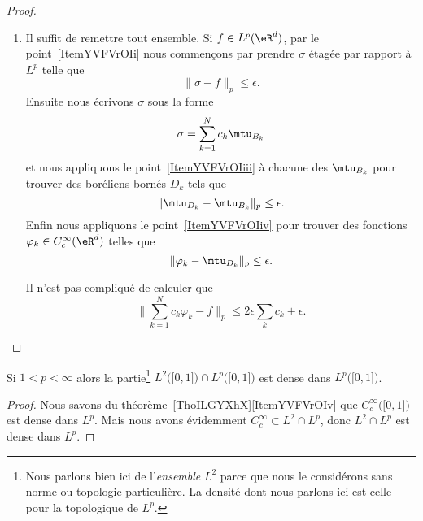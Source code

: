 \begin{proof}
\begin{enumerate}
		\item

		      Il suffit de remettre tout ensemble. Si \( f\in L^p(\eR^d)\), par le point~\ref{ItemYVFVrOIi} nous commençons par prendre \( \sigma\) étagée par rapport à \( L^p\) telle que
		      \begin{equation}
			      \| \sigma-f \|_p\leq\epsilon.
		      \end{equation}
		      Ensuite nous écrivons \( \sigma\) sous la forme
		      \begin{equation}
			      \sigma=\sum_{k=1}^Nc_k\mtu_{B_k}
		      \end{equation}
		      et nous appliquons le point~\ref{ItemYVFVrOIiii} à chacune des \( \mtu_{B_k}\) pour trouver des boréliens bornés \( D_k\) tels que
		      \begin{equation}
			      \| \mtu_{D_k}-\mtu_{B_k} \|_p\leq \epsilon.
		      \end{equation}
		      Enfin nous appliquons le point~\ref{ItemYVFVrOIiv} pour trouver des fonctions \( \varphi_k\in C^{\infty}_c(\eR^d)\) telles que
		      \begin{equation}
			      \| \varphi_k-\mtu_{D_k} \|_p\leq \epsilon.
		      \end{equation}

		      Il n'est pas compliqué de calculer que
		      \begin{equation}
			      \big\| \sum_{k=1}^Nc_k\varphi_k-f \big\|_p\leq 2\epsilon\sum_kc_k+\epsilon.
		      \end{equation}

	\end{enumerate}
\end{proof}

\begin{corollary}   \label{CorFZWooYNbtPz}
	Si \( 1<p<\infty\) alors la partie\footnote{Nous parlons bien ici de l'\emph{ensemble} \( L^2\) parce que nous le considérons sans norme ou topologie particulière. La densité dont nous parlons ici est celle pour la topologique de \( L^p\).} \( L^2\big( \mathopen[ 0 , 1 \mathclose] \big)\cap L^p\big( \mathopen[ 0 , 1 \mathclose] \big)\) est dense dans \( L^p\big( \mathopen[ 0 , 1 \mathclose] \big)\).
\end{corollary}

\begin{proof}
	Nous savons du théorème~\ref{ThoILGYXhX}\ref{ItemYVFVrOIv} que \(  C^{\infty}_c\big( \mathopen[ 0 , 1 \mathclose] \big)\) est dense dans \( L^p\). Mais nous avons évidemment \(  C^{\infty}_c\subset L^2\cap L^p\), donc \( L^2\cap L^p\) est dense dans \( L^p\).
\end{proof}

